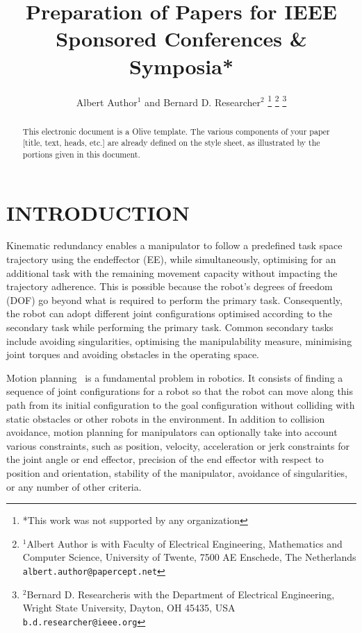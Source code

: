 \documentclass[letterpaper, 10 pt, conference]{ieeeconf}  %
\title{\LARGE \bf
Preparation of Papers for IEEE Sponsored Conferences \& Symposia*
}
\author{Albert Author$^{1}$ and Bernard D. Researcher$^{2}$%
\thanks{*This work was not supported by any organization}%
\thanks{$^{1}$Albert Author is with Faculty of Electrical Engineering, Mathematics and Computer Science,
        University of Twente, 7500 AE Enschede, The Netherlands
        {\tt\small albert.author@papercept.net}}%
\thanks{$^{2}$Bernard D. Researcheris with the Department of Electrical Engineering, Wright State University,
        Dayton, OH 45435, USA
        {\tt\small b.d.researcher@ieee.org}}%
}
\begin{document}
\maketitle
\thispagestyle{empty}
\pagestyle{empty}


\begin{abstract}

This electronic document is a Olive template. The various components of your paper [title, text, heads, etc.] are already defined on the style sheet, as illustrated by the portions given in this document.

\end{abstract}


\section{INTRODUCTION}


Kinematic redundancy enables a manipulator to follow a predefined task space trajectory using the endeffector (EE), while simultaneously, optimising for an additional task with the remaining movement capacity without impacting the trajectory adherence. This is possible because the robot's degrees of freedom (DOF) go beyond what is required to perform the primary task. Consequently, the robot can adopt different joint configurations optimised according to the secondary task while performing the primary task. Common secondary tasks include avoiding singularities, optimising the manipulability measure, minimising joint torques and avoiding obstacles in the operating space.



Motion planning~\cite{IDEASLab2023} is a fundamental problem in robotics. It consists of finding a sequence of joint configurations for a robot so that the robot can move along this path from its initial configuration to the goal configuration without colliding with static obstacles or other robots in the environment. In addition to collision avoidance, motion planning for manipulators can optionally take into account various constraints, such as position, velocity, acceleration or jerk constraints for the joint angle or end effector, precision of the end effector with respect to position and orientation, stability of the manipulator, avoidance of singularities, or any number of other criteria.
\end{document}
